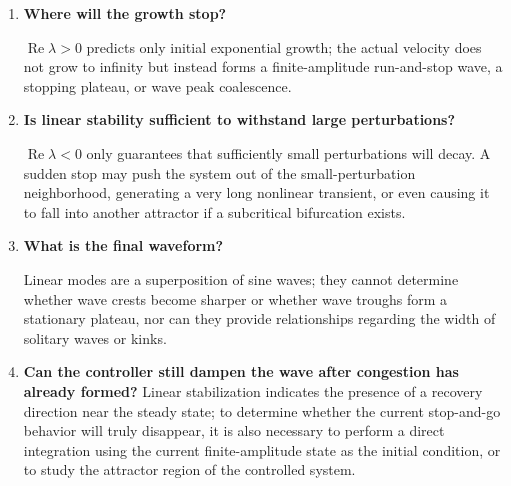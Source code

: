 \documentclass[11pt,a4paper,openany]{book}
\numberwithin{equation}{chapter}
\numberwithin{figure}{chapter}
\numberwithin{table}{chapter}
\begin{document}
\begin{enumerate}[leftmargin=1.6em,itemsep=4pt]
\item \textbf{Where will the growth stop?}




 $\operatorname{Re}\lambda>0$ predicts only initial exponential growth; the actual velocity does not grow to infinity but instead forms a finite-amplitude run-and-stop wave, a stopping plateau, or wave peak coalescence.







\item \textbf{Is linear stability sufficient to withstand large perturbations?}




 $\operatorname{Re}\lambda<0$ only guarantees that sufficiently small perturbations will decay. A sudden stop may push the system out of the small-perturbation neighborhood, generating a very long nonlinear transient, or even causing it to fall into another attractor if a subcritical bifurcation exists.







\item \textbf{What is the final waveform?}




Linear modes are a superposition of sine waves; they cannot determine whether wave crests become sharper or whether wave troughs form a stationary plateau, nor can they provide relationships regarding the width of solitary waves or kinks.







\item \textbf{Can the controller still dampen the wave after congestion has already formed?} Linear stabilization indicates the presence of a recovery direction near the steady state; to determine whether the current stop-and-go behavior will truly disappear, it is also necessary to perform a direct integration using the current finite-amplitude state as the initial condition, or to study the attractor region of the controlled system.







\end{enumerate}
\end{document}

